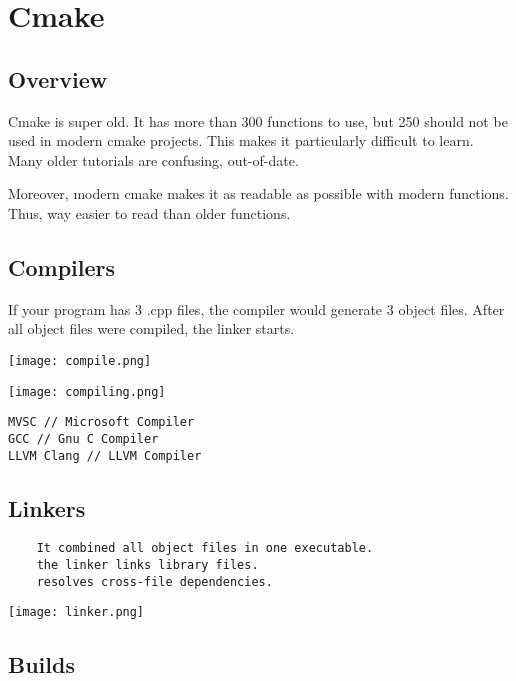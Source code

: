 \chapter{Cmake}

\section{Overview}

Cmake is super old. It has more than 300 functions to use, but 250 should not be used in modern cmake projects. 
This makes it particularly difficult to learn. Many older tutorials are confusing, out-of-date.

Moreover, modern cmake makes it as readable as possible with modern functions. Thus, way easier to read than older
functions.

\section{Compilers}

If your program has 3 .cpp files, the compiler would generate 3 object files. 
After all object files were compiled, the linker starts. 

\begin{center}
\texttt{[image: compile.png]}
\end{center}

\begin{center}
\texttt{[image: compiling.png]}
\end{center}

\begin{verbatim}
MVSC // Microsoft Compiler
GCC // Gnu C Compiler
LLVM Clang // LLVM Compiler
\end{verbatim}

\section{Linkers}

\begin{verbatim}
    It combined all object files in one executable.
    the linker links library files. 
    resolves cross-file dependencies.  
\end{verbatim}

\begin{center}
\texttt{[image: linker.png]}
\end{center}

\section{Builds}

